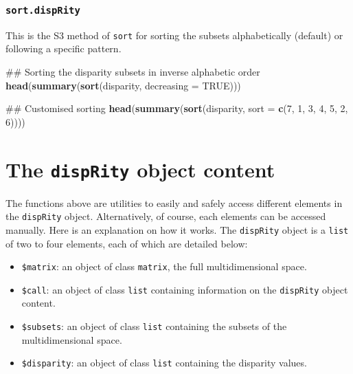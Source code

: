 \documentclass[]{book}
\newenvironment{Shaded}{\begin{snugshade}}{\end{snugshade}}
\newcommand{\KeywordTok}[1]{\textcolor[rgb]{0.13,0.29,0.53}{\textbf{#1}}}
\newcommand{\DataTypeTok}[1]{\textcolor[rgb]{0.13,0.29,0.53}{#1}}
\newcommand{\DecValTok}[1]{\textcolor[rgb]{0.00,0.00,0.81}{#1}}
\newcommand{\OtherTok}[1]{\textcolor[rgb]{0.56,0.35,0.01}{#1}}
\newcommand{\NormalTok}[1]{#1}
\providecommand{\tightlist}{%
  \setlength{\itemsep}{0pt}\setlength{\parskip}{0pt}}
\theoremstyle{definition}
\theoremstyle{definition}
\theoremstyle{definition}
\theoremstyle{remark}
\begin{document}
\subsubsection{\texorpdfstring{\texttt{sort.dispRity}}{sort.dispRity}}\label{sort.disprity}

This is the S3 method of \texttt{sort} for sorting the subsets
alphabetically (default) or following a specific pattern.

\begin{Shaded}
\begin{Highlighting}[]
\NormalTok{## Sorting the disparity subsets in inverse alphabetic order}
\KeywordTok{head}\NormalTok{(}\KeywordTok{summary}\NormalTok{(}\KeywordTok{sort}\NormalTok{(disparity, }\DataTypeTok{decreasing =} \OtherTok{TRUE}\NormalTok{)))}

\NormalTok{## Customised sorting}
\KeywordTok{head}\NormalTok{(}\KeywordTok{summary}\NormalTok{(}\KeywordTok{sort}\NormalTok{(disparity, }\DataTypeTok{sort =} \KeywordTok{c}\NormalTok{(}\DecValTok{7}\NormalTok{, }\DecValTok{1}\NormalTok{, }\DecValTok{3}\NormalTok{, }\DecValTok{4}\NormalTok{, }\DecValTok{5}\NormalTok{, }\DecValTok{2}\NormalTok{, }\DecValTok{6}\NormalTok{))))}
\end{Highlighting}
\end{Shaded}

\section{\texorpdfstring{The \texttt{dispRity} object
content}{The dispRity object content}}\label{the-disprity-object-content}

The functions above are utilities to easily and safely access different
elements in the \texttt{dispRity} object. Alternatively, of course, each
elements can be accessed manually. Here is an explanation on how it
works. The \texttt{dispRity} object is a \texttt{list} of two to four
elements, each of which are detailed below:

\begin{itemize}
\tightlist
\item
  \texttt{\$matrix}: an object of class \texttt{matrix}, the full
  multidimensional space.
\item
  \texttt{\$call}: an object of class \texttt{list} containing
  information on the \texttt{dispRity} object content.
\item
  \texttt{\$subsets}: an object of class \texttt{list} containing the
  subsets of the multidimensional space.
\item
  \texttt{\$disparity}: an object of class \texttt{list} containing the
  disparity values.
\end{itemize}
\end{document}

